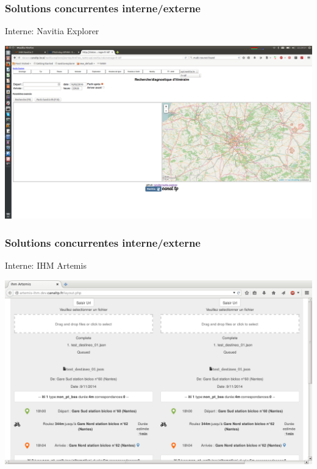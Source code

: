 \documentclass[table]{beamer}
\begin{document}
\begin{frame}
  \frametitle{Solutions concurrentes interne/externe}
  \begin{description}
    \item[Interne: Navitia Explorer]
  \end{description}
  \centering\includegraphics[width=\linewidth]{images/navitia_explorer}
\end{frame}

\begin{frame}
  \frametitle{Solutions concurrentes interne/externe}
  \begin{description}
    \item[Interne: IHM Artemis]
  \end{description}
  \centering\includegraphics[width=\linewidth]{images/ihm-artemis}
\end{frame}
\end{document}
